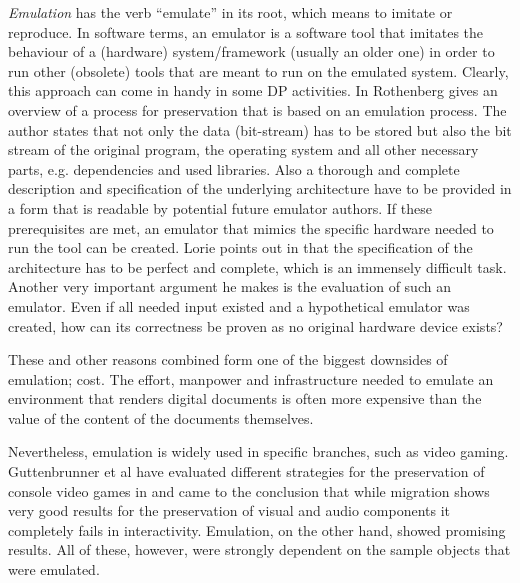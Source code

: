 \textit{Emulation} has the verb ``emulate'' in its root, which means to imitate or reproduce.
In software terms, an emulator is a software tool that imitates the behaviour of a (hardware) system/framework (usually an older one) in order to run other (obsolete) tools that are meant to run on the emulated system. Clearly, this approach can come in handy in some DP activities.
In \cite{rothenberg:1999:ensuring} Rothenberg gives an overview of a process for preservation that is based on an emulation process. The author states that not only the data (bit-stream) has to be stored but also the bit stream of the original program, the operating system and all other necessary parts, e.g. dependencies and used libraries. Also a thorough and complete description and specification of the underlying architecture have to be provided in a form that is readable by potential future emulator authors. If these prerequisites are met, an emulator that mimics the specific hardware needed to run the tool can be created.
Lorie points out in \cite{Lorie:2001:LTP:379437.379726} that the specification of the architecture has to be perfect and complete, which is an immensely difficult task. Another very important argument he makes is the evaluation of such an emulator. Even if all needed input existed and a hypothetical emulator was created, how can its correctness be proven as no original hardware device exists?

These and other reasons combined form one of the biggest downsides of emulation; cost. The effort, manpower and infrastructure needed to emulate an environment that renders digital documents is often more expensive than the value of the content of the documents themselves.

Nevertheless, emulation is widely used in specific branches, such as video gaming.
Guttenbrunner et al have evaluated different strategies for the preservation of console video games in \cite{guttenbrunner:2008:evaluating} and came to the conclusion that while migration shows very good results for the preservation of visual and audio components it completely fails in interactivity. Emulation, on the other hand, showed promising results. All of these, however, were strongly dependent on the sample objects that were emulated.

